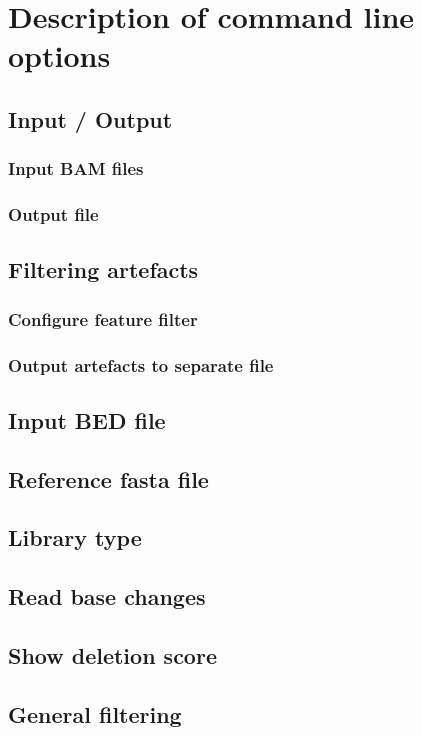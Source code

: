 \documentclass[10pt,a4paper]{article}
\begin{document}
\section{Description of command line options}
\subsection{Input / Output}
\subsubsection{Input BAM files}
\subsubsection{Output file}

%
\subsection{Filtering artefacts}
\subsubsection{Configure feature filter}

\subsubsection{Output artefacts to separate file}

%
\subsection{Input BED file}

\subsection{Reference fasta file}

%
\subsection{Library type}

%
\subsection{Read base changes}

\subsection{Show deletion score}

\subsection{General filtering}
\end{document}

